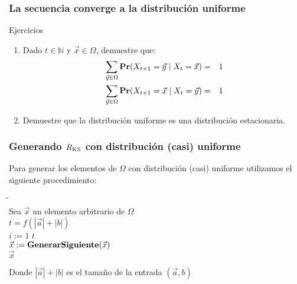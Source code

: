 \begin{frame}
\frametitle{La secuencia converge a la distribución uniforme}

{\footnotesize

\begin{exampleblock}{Ejercicios}
\begin{enumerate}
\item Dado $t \in \mathbb{N}$ y $\vec x \in \Omega$, demuestre que:
\begin{eqnarray*}
\sum_{\vec y \in \Omega} {\rm {\bf Pr}}(X_{t+1} = \vec y \mid X_{t} = \vec x) & = & 1\\
\sum_{\vec y \in \Omega} {\rm {\bf Pr}}(X_{t+1} = \vec x \mid X_{t} = \vec y) & = & 1
\end{eqnarray*}


\item Demuestre que la distribución uniforme es una distribución estacionaria. 
\end{enumerate}

\end{exampleblock}




}

\end{frame}


\begin{frame}
\frametitle{Generando $R_{\text{KS}}$ con distribución (casi) uniforme}

{\small

Para generar los elementos de $\Omega$ con distribución (casi) uniforme utilizamos el siguiente procedimiento:
\begin{tabbing}
\phantom{MM}\=\phantom{MM}\=\phantom{MM}\=\\
\> Sea $\vec x$ un elemento arbitrario de $\Omega$\\
\> $t = f(|\vec a| + |b|)$\\
\> \afor $i := 1$ \ato $t$ \ado\\
\> \> $\vec x := \text{\bf GenerarSiguiente}(\vec x)$\\
\> \areturn $\vec x$
\end{tabbing}
Donde $|\vec a| + |b|$ es el tamaño de la entrada $(\vec a,b)$



}

\end{frame}



